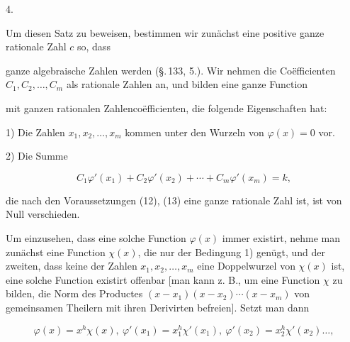 4. 





Um diesen Satz zu beweisen, bestimmen wir zunächst eine positive ganze rationale Zahl $c$ so, dass


ganze algebraische Zahlen werden (§.\,133, 5.). Wir nehmen die Coëfficienten $C_1, C_2, \ldots, C_m$ als  rationale Zahlen an, und bilden eine ganze Function


mit ganzen rationalen Zahlencoëfficienten, die folgende Eigenschaften hat:

1) Die Zahlen $x_1, x_2, \ldots, x_m$ kommen unter den Wurzeln von $\varphi(x)=0$ vor.

2) Die Summe

\[
C_1\varphi'(x_1)+C_2\varphi'(x_2)+\cdots+C_m\varphi'(x_m) = k,
\]

die nach den Voraussetzungen (12), (13) eine ganze rationale Zahl ist, ist von Null verschieden.

Um einzusehen, dass eine solche Function $\varphi(x)$ immer existirt, nehme man zunächst eine Function $\chi(x)$, die nur der Bedingung 1) genügt, und der zweiten, dass keine der Zahlen $x_1, x_2, \ldots, x_m$ eine Doppelwurzel von $\chi(x)$ ist, eine solche Function existirt offenbar [man kann z. B., um eine Function $\chi$ zu bilden, die Norm des Productes $(x-x_1)(x-x_2)\cdots(x-x_m)$ von gemeinsamen Theilern mit ihren Derivirten befreien]. Setzt man dann

\[
\varphi(x) = x^h\chi(x),\ \varphi'(x_1) = x_1^h\chi'(x_1),\ \varphi'(x_2) = x_2^h\chi'(x_2)\ldots,
\]
